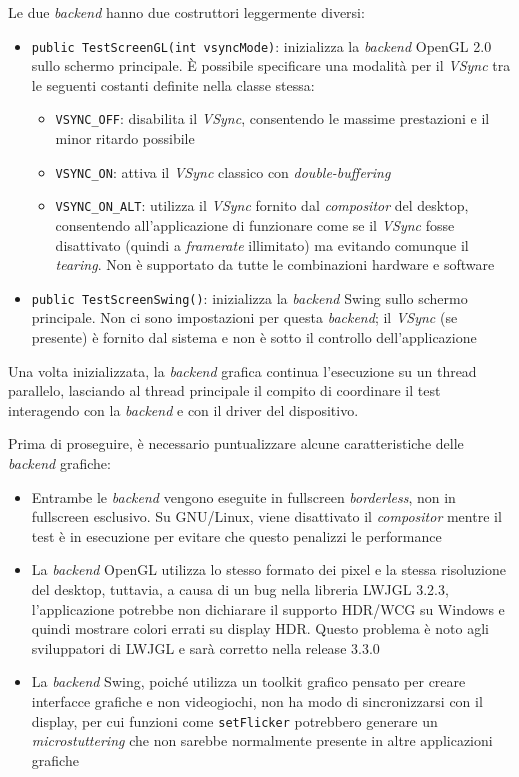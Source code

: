 Le due \textit{backend} hanno due costruttori leggermente diversi:
\begin{itemize}
	\item \texttt{public TestScreenGL(int vsyncMode)}: inizializza la \textit{backend} OpenGL 2.0 sullo schermo principale. È possibile specificare una modalità per il \textit{VSync} tra le seguenti costanti definite nella classe stessa:
	\begin{itemize}
		\item \texttt{VSYNC\_OFF}: disabilita il \textit{VSync}, consentendo le massime prestazioni e il minor ritardo possibile
		\item \texttt{VSYNC\_ON}: attiva il \textit{VSync} classico con \textit{double-buffering}
		\item \texttt{VSYNC\_ON\_ALT}: utilizza il \textit{VSync} fornito dal \textit{compositor} del desktop, consentendo all'applicazione di funzionare come se il \textit{VSync} fosse disattivato (quindi a \textit{framerate} illimitato) ma evitando comunque il \textit{tearing}. Non è supportato da tutte le combinazioni hardware e software
	\end{itemize}
	\item \texttt{public TestScreenSwing()}: inizializza la \textit{backend} Swing sullo schermo principale. Non ci sono impostazioni per questa \textit{backend}; il \textit{VSync} (se presente) è fornito dal sistema e non è sotto il controllo dell'applicazione
\end{itemize}

Una volta inizializzata, la \textit{backend} grafica continua l'esecuzione su un thread parallelo, lasciando al thread principale il compito di coordinare il test interagendo con la \textit{backend} e con il driver del dispositivo.

Prima di proseguire, è necessario puntualizzare alcune caratteristiche delle \textit{backend} grafiche:\begin{itemize}
	\item Entrambe le \textit{backend} vengono eseguite in fullscreen \textit{borderless}, non in fullscreen esclusivo. Su GNU/Linux, viene disattivato il \textit{compositor} mentre il test è in esecuzione per evitare che questo penalizzi le performance
	\item La \textit{backend} OpenGL utilizza lo stesso formato dei pixel e la stessa risoluzione del desktop, tuttavia, a causa di un bug nella libreria LWJGL 3.2.3, l'applicazione potrebbe non dichiarare il supporto HDR/WCG su Windows e quindi mostrare colori errati su display HDR. Questo problema è noto agli sviluppatori di LWJGL e sarà corretto nella release 3.3.0
	\item La \textit{backend} Swing, poiché utilizza un toolkit grafico pensato per creare interfacce grafiche e non videogiochi, non ha modo di sincronizzarsi con il display, per cui funzioni come \texttt{setFlicker} potrebbero generare un \textit{microstuttering} che non sarebbe normalmente presente in altre applicazioni grafiche
\end{itemize}

